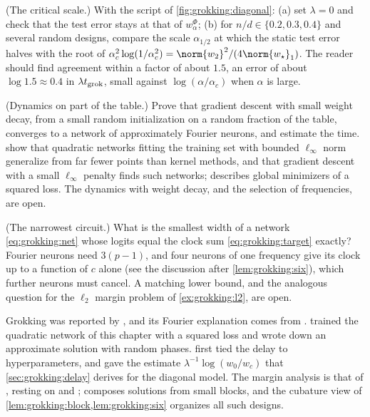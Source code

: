 \begin{refsection}
\begin{exercises}
\item \simulation (The critical scale.) With the script of \cref{fig:grokking:diagonal}: (a) set $\lambda=0$ and check that the test error stays at that of $w^\Phi_\alpha$; (b) for $n/d\in\{0.2,0.3,0.4\}$ and several random designs, compare the scale $\alpha_{1/2}$ at which the static test error halves with the root of $\alpha_c^2\log(1/\alpha_c^2)=\norm{w_2}^2/(4\norm{w_\star}_1)$. The reader should find agreement within a factor of about $1.5$, an error of about $\log1.5\approx0.4$ in $\lambda t_{\mathrm{grok}}$, small against $\log(\alpha/\alpha_c)$ when $\alpha$ is large. \label{ex:grokking:alphac}

\item \research (Dynamics on part of the table.) Prove that gradient descent with small weight decay, from a small random initialization on a random fraction of the table, converges to a network of approximately Fourier neurons, and estimate the time. \Textcite{MohamadiEtAl2024} show that quadratic networks fitting the training set with bounded $\ell_\infty$ norm generalize from far fewer points than kernel methods, and that gradient descent with a small $\ell_\infty$ penalty finds such networks; \textcite{Tian2025} describes global minimizers of a squared loss. The dynamics with weight decay, and the selection of frequencies, are open. \label{ex:grokking:dynamics}

\item \research (The narrowest circuit.) What is the smallest width of a network \eqref{eq:grokking:net} whose logits equal the clock sum \eqref{eq:grokking:target} exactly? Fourier neurons need $3(p-1)$, and four neurons of one frequency give its clock up to a function of $c$ alone (see the discussion after \cref{lem:grokking:six}), which further neurons must cancel. A matching lower bound, and the analogous question for the $\ell_2$ margin problem of \cref{ex:grokking:l2}, are open. \label{ex:grokking:narrow}
\end{exercises}

\notesandrefs
Grokking was reported by \textcite{PowerEtAl2022}, and its Fourier explanation comes from \textcite{NandaEtAl2023}. \Textcite{Gromov2023} trained the quadratic network of this chapter with a squared loss and wrote down an approximate solution with random phases. \Textcite{LiuEtAl2022,LiuEtAl2023} first tied the delay to hyperparameters, and \textcite{LiuEtAl2023} gave the estimate $\lambda^{-1}\log(w_0/w_c)$ that \cref{sec:grokking:delay} derives for the diagonal model. The margin analysis is that of \textcite{MorwaniEtAl2024}, resting on \textcite{WeiEtAl2019} and \textcite{LyuLi2020}; \textcite{Tian2025} composes solutions from small blocks, and the cubature view of \cref{lem:grokking:block,lem:grokking:six} organizes all such designs.


\end{refsection}
